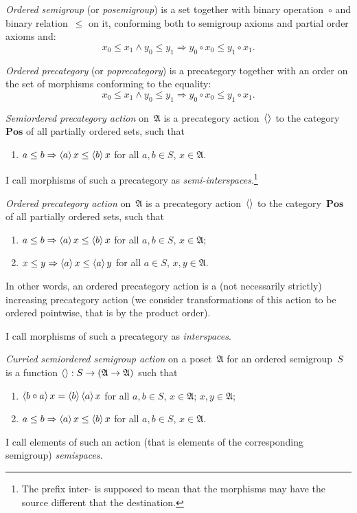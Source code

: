 \documentclass{amsart}
\begin{document}
\begin{defn}
\emph{Ordered semigroup} (or \emph{posemigroup}) is a set together with binary operation~$\circ$ and binary relation~$\leq$ on it, conforming both to semigroup axioms and partial order axioms and:
\[ x_0\leq x_1\land y_0\leq y_1\Rightarrow y_0\circ x_0\leq y_1\circ x_1. \]
\end{defn}

\begin{defn}
\emph{Ordered precategory} (or \emph{poprecategory}) is
a precategory together with an order on the set of morphisms conforming to the equality:
\[ x_0\leq x_1\land y_0\leq y_1\Rightarrow y_0\circ x_0\leq y_1\circ x_1. \]
\end{defn}

\begin{defn}
\emph{Semiordered precategory action} on~$\mathfrak{A}$ is a precategory action~$\left\langle \right\rangle$ to the category~$\mathbf{Pos}$ of all partially ordered sets, such that
\begin{enumerate}
\item $a\leq b\Rightarrow\left\langle a\right\rangle x\leq \left\langle b\right\rangle x$ for all $a,b\in S$, $x\in\mathfrak{A}$.
\end{enumerate}
I call morphisms of such a precategory as \emph{semi-interspaces}.\footnote{The prefix inter- is supposed to mean that the morphisms may have the source different that the destination.}
\end{defn}

\begin{defn}
\emph{Ordered precategory action} on~$\mathfrak{A}$ is a precategory action~$\left\langle \right\rangle$ to the category~$\mathbf{Pos}$ of all partially ordered sets, such that
\begin{enumerate}
\item $a\leq b\Rightarrow\left\langle a\right\rangle x\leq \left\langle b\right\rangle x$ for all $a,b\in S$, $x\in\mathfrak{A}$;
\item $x\leq y\Rightarrow\left\langle a\right\rangle x\leq \left\langle a\right\rangle y$ for all $a\in S$, $x,y\in\mathfrak{A}$.
\end{enumerate}
In other words, an ordered precategory action is a (not necessarily strictly) increasing precategory action (we consider transformations of this action to be ordered pointwise, that is by the product order).

I call morphisms of such a precategory as \emph{interspaces}.
\end{defn}

\begin{defn}
\emph{Curried semiordered semigroup action} on a poset~$\mathfrak{A}$ for an ordered semigroup~$S$ is a function $\left\langle \right\rangle:S\to(\mathfrak{A}\to\mathfrak{A})$ such that
\begin{enumerate}
\item $\left\langle b\circ a\right\rangle x = \left\langle b\right\rangle\left\langle a\right\rangle x$ for all $a,b\in S$, $x\in\mathfrak{A}$;
$x,y\in\mathfrak{A}$;
\item $a\leq b\Rightarrow\left\langle a\right\rangle x\leq \left\langle b\right\rangle x$ for all $a,b\in S$, $x\in\mathfrak{A}$.
\end{enumerate}
I call elements of such an action (that is elements of the corresponding semigroup) \emph{semispaces}.
\end{defn}
\end{document}
